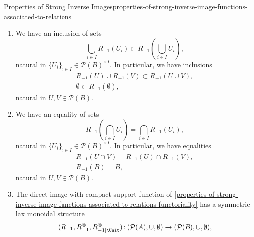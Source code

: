 \begin{proposition}{Properties of Strong Inverse Images}{properties-of-strong-inverse-image-functions-associated-to-relations}
\begin{enumerate}
\begin{itemize}
\begin{itemize}
                        \item We have $U\subset R_{-1}(V)$.
                    \end{itemize}%
            \end{itemize}%
        \item\label{properties-of-strong-inverse-image-functions-associated-to-relations-lax-preservation-of-colimits}We have an inclusion of sets
            \[
                \bigcup_{i\in I}R_{-1}(U_{i})%
                \subset%
                R_{-1}(\bigcup_{i\in I}U_{i}),%
            \]%
            natural in $\{U_{i}\}_{i\in I}\in\mathcal{P}(B)^{\times I}$. In particular, we have inclusions%
            \[
                \begin{gathered}
                    R_{-1}(U)\cup R_{-1}(V) \subset R_{-1}(U\cup V),\\
                    \emptyset               \subset R_{-1}(\emptyset),
                \end{gathered}
            \]%
            natural in $U,V\in\mathcal{P}(B)$.
        \item\label{properties-of-strong-inverse-image-functions-associated-to-relations-preservation-of-limits}We have an equality of sets
            \[
                    R_{-1}(\bigcap_{i\in I}U_{i})%
                    =%
                    \bigcap_{i\in I}R_{-1}(U_{i}),%
            \]%
            natural in $\{U_{i}\}_{i\in I}\in\mathcal{P}(B)^{\times I}$. In particular, we have equalities%
            \[
                \begin{gathered}
                    R_{-1}(U\cap V) = R_{-1}(U)\cap R_{-1}(V),\\
                    R_{-1}(B)       = B,
                \end{gathered}
            \]%
            natural in $U,V\in\mathcal{P}(B)$.
        \item\label{properties-of-strong-inverse-image-functions-associated-to-relations-symmetric-lax-monoidality-with-respect-to-unions}The direct image with compact support function of \cref{properties-of-strong-inverse-image-functions-associated-to-relations-functoriality} has a symmetric lax monoidal structure
            \[
                (R_{-1},R^{\otimes}_{-1},R^{\otimes}_{-1|\Unit})
                \colon
                (\mathcal{P}(A),\cup,\emptyset)
                \to
                (\mathcal{P}(B),\cup,\emptyset),
\]
\end{enumerate}
\end{proposition}
